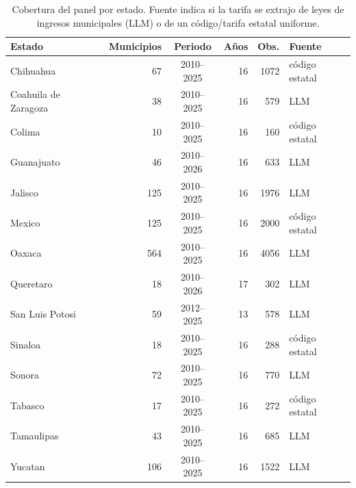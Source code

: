 \begin{table}[htbp]\centering\small
\begin{tabular}{lrcrrl}
\toprule
Estado & Municipios & Periodo & Años & Obs. & Fuente \\
\midrule
Chihuahua & 67 & 2010–2025 & 16 & 1072 & código estatal \\
Coahuila de Zaragoza & 38 & 2010–2025 & 16 & 579 & LLM \\
Colima & 10 & 2010–2025 & 16 & 160 & código estatal \\
Guanajuato & 46 & 2010–2026 & 16 & 633 & LLM \\
Jalisco & 125 & 2010–2025 & 16 & 1976 & LLM \\
Mexico & 125 & 2010–2025 & 16 & 2000 & código estatal \\
Oaxaca & 564 & 2010–2025 & 16 & 4056 & LLM \\
Queretaro & 18 & 2010–2026 & 17 & 302 & LLM \\
San Luis Potosi & 59 & 2012–2025 & 13 & 578 & LLM \\
Sinaloa & 18 & 2010–2025 & 16 & 288 & código estatal \\
Sonora & 72 & 2010–2025 & 16 & 770 & LLM \\
Tabasco & 17 & 2010–2025 & 16 & 272 & código estatal \\
Tamaulipas & 43 & 2010–2025 & 16 & 685 & LLM \\
Yucatan & 106 & 2010–2025 & 16 & 1522 & LLM \\
\bottomrule
\end{tabular}
\caption{Cobertura del panel por estado. Fuente indica si la tarifa se extrajo de leyes de ingresos municipales (LLM) o de un código/tarifa estatal uniforme.}
\label{tab:cobertura-estados}
\end{table}

